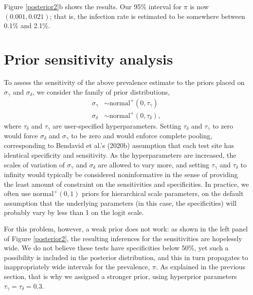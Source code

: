 \documentclass[11pt]{article}
\begin{document}
Figure \ref{posterior2}b shows the results.  Our 95\% interval for
$\pi$ is now $(0.001, 0.021)$; that is, the infection rate is
estimated to be somewhere between 0.1\% and 2.1\%.

\section{Prior sensitivity analysis}

To assess the sensitivity of the above prevalence estimate to the
priors placed on $\sigma_{\gamma}$ and $\sigma_{\delta}$, we consider
the family of prior distributions,
%
\begin{align*}
  \sigma_{\gamma} & \sim \mbox{normal}^+(0, \tau_{\gamma})\\
\sigma_{\delta} & \sim  \mbox{normal}^+(0, \tau_{\delta}),
\end{align*}
%
where $\tau_{\delta} $ and $\tau_{\gamma} $ are user-specified
hyperparameters. Setting $\tau_{\delta}$ and $\tau_{\gamma}$ to zero
would force $\sigma_{\delta}$ and $\sigma_{\gamma}$ to be zero and
would enforce complete pooling, corresponding to Bendavid et al.'s
(2020b) assumption that each test site has identical specificity and
sensitivity. As the hyperparameters are increased, the scales of
variation of $\sigma_{\gamma}$ and $\sigma_{\delta}$ are allowed to
vary more, and setting $\tau_{\gamma}$ and $\tau_{\delta}$ to infinity
would typically be considered noninformative in the sense of providing
the least amount of constraint on the sensitivities and specificities.
In practice, we often use $\mbox{normal}^+(0,1)$ priors for
hierarchical scale parameters, on the default assumption that the
underlying parameters (in this case, the specificities) will probably
vary by less than 1 on the logit scale.

For this problem, however, a weak prior does not work: as shown in the
left panel of Figure \ref{posterior2}, the resulting inferences for
the sensitivities are hopelessly wide. We do not believe these tests
have specificities below 50\%, yet such a possibility is included in
the posterior distribution, and this in turn propagates to
inappropriately wide intervals for the prevalence, $\pi$.  As
explained in the previous section, that is why we assigned a stronger
prior, using hyperprior parameters $\tau_{\gamma}=\tau_{\delta}=0.3$.
\end{document}

